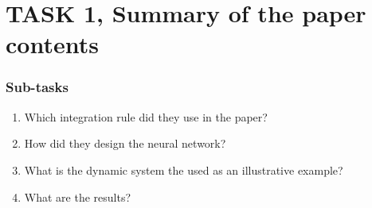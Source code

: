 \section{TASK 1, Summary of the paper contents}

\begin{frame}
	\frametitle{Sub-tasks}
	\begin{enumerate}
		\item Which integration rule did they use in the paper?
		\item How did they design the neural network?
		\item What is the dynamic system the used as an illustrative example?
		\item What are the results?
	\end{enumerate}
\end{frame}
